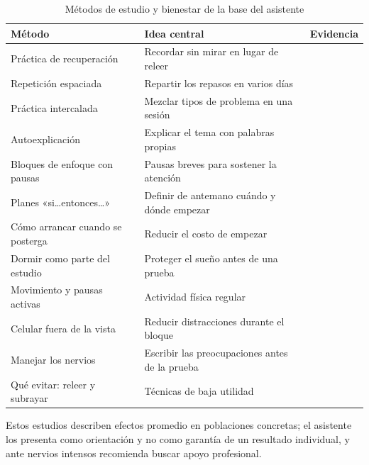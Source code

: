 \begin{table}[H]
\centering\small
\caption{Métodos de estudio y bienestar de la base del asistente}\label{tab:metodos}
\begin{tabularx}{\textwidth}{>{\raggedright\arraybackslash}p{4.6cm} >{\raggedright\arraybackslash}X >{\raggedright\arraybackslash}p{3.6cm}}
\toprule
Método & Idea central & Evidencia \\
\midrule
Práctica de recuperación & Recordar sin mirar en lugar de releer & \cite{Roediger2006,Dunlosky2013} \\
Repetición espaciada & Repartir los repasos en varios días & \cite{Cepeda2006,Dunlosky2013} \\
Práctica intercalada & Mezclar tipos de problema en una sesión & \cite{Rohrer2007,Dunlosky2013} \\
Autoexplicación & Explicar el tema con palabras propias & \cite{Chi1994,Dunlosky2013} \\
Bloques de enfoque con pausas & Pausas breves para sostener la atención & \cite{Ariga2011} \\
Planes «si\dots entonces\dots» & Definir de antemano cuándo y dónde empezar & \cite{Gollwitzer2006} \\
Cómo arrancar cuando se posterga & Reducir el costo de empezar & \cite{Steel2007} \\
Dormir como parte del estudio & Proteger el sueño antes de una prueba & \cite{Curcio2006} \\
Movimiento y pausas activas & Actividad física regular & \cite{Hillman2008} \\
Celular fuera de la vista & Reducir distracciones durante el bloque & \cite{Ward2017} \\
Manejar los nervios & Escribir las preocupaciones antes de la prueba & \cite{Ramirez2011} \\
Qué evitar: releer y subrayar & Técnicas de baja utilidad & \cite{Dunlosky2013} \\
\bottomrule
\end{tabularx}
\end{table}

Estos estudios describen efectos promedio en poblaciones concretas; el asistente los presenta como orientación y no como garantía de un resultado individual, y ante nervios intensos recomienda buscar apoyo profesional.

